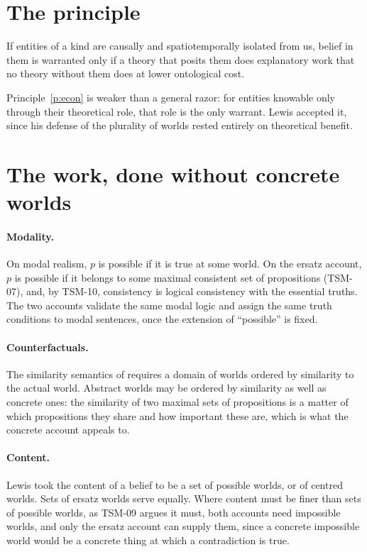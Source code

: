 \documentclass{situationist-preprint}
\begin{document}
\section{The principle}

\begin{principle}\label{p:econ}
If entities of a kind are causally and spatiotemporally isolated from us, belief in them is warranted only if a theory that posits them does explanatory work that no theory without them does at lower ontological cost.
\end{principle}

Principle~\ref{p:econ} is weaker than a general razor: for entities knowable only through their theoretical role, that role is the only warrant. Lewis accepted it, since his defense of the plurality of worlds rested entirely on theoretical benefit.

\section{The work, done without concrete worlds}

\paragraph{Modality.} On modal realism, $p$ is possible if it is true at some world. On the ersatz account, $p$ is possible if it belongs to some maximal consistent set of propositions (TSM-07), and, by TSM-10, consistency is logical consistency with the essential truths. The two accounts validate the same modal logic and assign the same truth conditions to modal sentences, once the extension of \enquote{possible} is fixed.

\paragraph{Counterfactuals.} The similarity semantics of \citet{Lewis1973} requires a domain of worlds ordered by similarity to the actual world. Abstract worlds may be ordered by similarity as well as concrete ones: the similarity of two maximal sets of propositions is a matter of which propositions they share and how important these are, which is what the concrete account appeals to.

\paragraph{Content.} Lewis took the content of a belief to be a set of possible worlds, or of centred worlds. Sets of ersatz worlds serve equally. Where content must be finer than sets of possible worlds, as TSM-09 argues it must, both accounts need impossible worlds, and only the ersatz account can supply them, since a concrete impossible world would be a concrete thing at which a contradiction is true.
\end{document}

